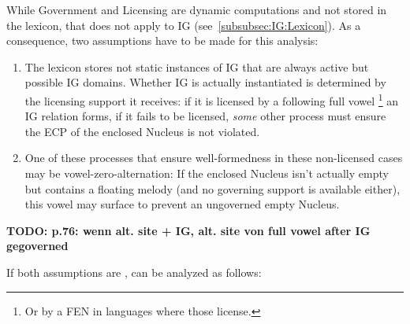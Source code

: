 While Government and Licensing are dynamic computations and not stored in the lexicon,
that does not apply to \gls{IG}
(see~\cref{subsubsec:IG:Lexicon}).
As a consequence, two assumptions have to be made for this
analysis:
\begin{enumerate}
\item The lexicon stores not static instances of \gls{IG} that are
  always active but possible \gls{IG} domains. Whether \gls{IG}
  is actually instantiated is determined by the licensing  support
  it receives: if it is licensed by a following full vowel%
  \footnote{Or by a \gls{FEN} in languages where those license.}
  an \gls{IG} relation forms, if it fails to be licensed, \emph{some}
  other process must ensure the \gls{ECP} of the enclosed Nucleus
  is not violated.
\item One of these processes that ensure well-formedness in these
  non-licensed cases may be vowel-zero-alternation:
  If the enclosed Nucleus isn't actually empty but contains a
  floating melody (and no governing support is available either),
  this vowel may surface to prevent an ungoverned empty Nucleus\footnotemark.
\end{enumerate}

\begin{deleted}
\begin{structure}{ \ti{[handlUN]}}
  \emptyV[gov]
  \emptyV
  \Ng[nolic]
  \fen
\end{structure}

\bigskip\textbf{TODO: p.76: wenn alt. site + IG, alt. site von full vowel after IG gegoverned}
\end{deleted}

If both assumptions are , 
can be analyzed as follows:
\begin{structure}{ \ti{[handlUN]}}
  \emptyV
  \emptyV
  \Ng[nolic]
  \fen
\end{structure}


\bigskip
{}